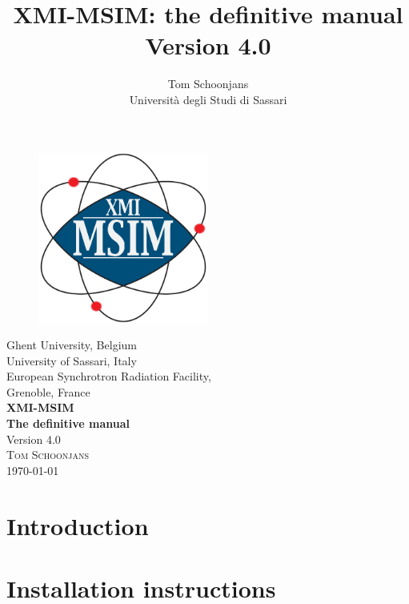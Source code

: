 \documentclass[11pt,a4paper,oneside,titlepage]{article}
\title{XMI-MSIM: the definitive manual\\\small{Version 4.0}}
\author{Tom Schoonjans\\Universit\`a degli Studi di Sassari}
\begin{document}
\begin{titlepage}
\begin{center}
\begin{figure}
\begin{center}
\includegraphics[width=0.5\textwidth]{Logo_xmi_msim.png}
\end{center}
\end{figure}
\vspace{1cm}
\Large{Ghent University, Belgium\\}
\vspace{0.7cm}
\Large{University of Sassari, Italy\\}
\vspace{0.7cm}
\Large{European Synchrotron Radiation Facility,\\Grenoble, France\\}
\vspace{1.5cm}
\Huge{\bfseries{XMI-MSIM\\}}
\vspace{1.5cm}
\huge{\bfseries{The definitive manual\\}}
\vspace{1.5cm}
\Large{Version 4.0\\}
\vspace{1.5cm}
\textsc{\large{Tom Schoonjans\\}}
\vfill
{\large \today}
\end{center}
\end{titlepage}


\tableofcontents
\newpage

\section{Introduction}\label{introduction}


\section{Installation instructions}\label{Installation-instructions}

\end{document}
